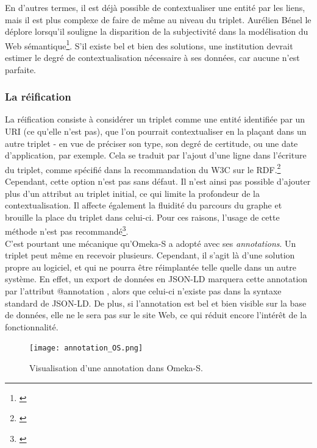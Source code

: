 \documentclass[a4paper,12pt,twoside]{book}
\begin{document}
En d'autres termes, il est déjà possible de contextualiser une entité par les liens, mais il est plus complexe de faire de même au niveau du triplet. Aurélien Bénel le déplore lorsqu'il souligne la disparition de la subjectivité dans la modélisation du Web sémantique\footnote{\cite{benelArchivesNumeriquesConstruction2017}}. S'il existe bel et bien des solutions, une institution devrait estimer le degré de contextualisation nécessaire à ses données, car aucune n'est parfaite.\\


\subsubsection{La réification}\label{3-reification}
La réification consiste à considérer un triplet comme une entité identifiée par un URI (ce qu'elle n'est pas), que l'on pourrait contextualiser en la plaçant dans un autre triplet - en vue de préciser son type, son degré de certitude, ou une date d'application, par exemple. Cela se traduit par l'ajout d'une ligne dans l'écriture du triplet, comme spécifié dans la recommandation du W3C sur le RDF.\footnote{\cite{worldwidewebconsortiumRDFSemanticsReification2004}}\\

Cependant, cette option n'est pas sans défaut. Il n'est ainsi pas possible d'ajouter plus d'un attribut au triplet initial, ce qui limite la profondeur de la contextualisation. Il affecte également la fluidité du parcours du graphe et brouille la place du triplet dans celui-ci. Pour ces raisons, l'usage de cette méthode n'est pas recommandé\footnote{\cite{poupeauQuelEvenementOu2010}}.\\

C'est pourtant une mécanique qu'Omeka-S a adopté avec ses \textit{annotations}. Un triplet peut même en recevoir plusieurs. Cependant, il s'agit là d'une solution propre au logiciel, et qui ne pourra être réimplantée telle quelle dans un autre système. En effet, un export de données en JSON-LD marquera cette annotation par l'attribut \og @annotation \fg, alors que celui-ci n'existe pas dans la syntaxe standard de JSON-LD. De plus, si l'annotation est bel et bien visible sur la base de données, elle ne le sera pas sur le site Web, ce qui réduit encore l'intérêt de la fonctionnalité.\\
 \begin{figure}[h]
    \centering
    \texttt{[image: annotation\_OS.png]}
    \caption{Visualisation d'une annotation dans Omeka-S.}
    \label{fig:enter-label}
\end{figure}
\end{document}

